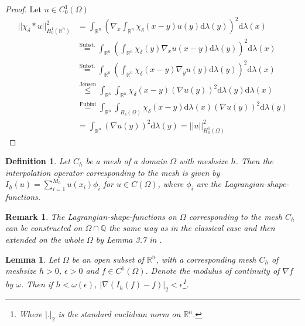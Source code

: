 \documentclass[11pt,a4paper,leqno]{report}
\newtheorem{lemma}[theorem]{Lemma}
\newtheorem{definition}[theorem]{Definition}
\newtheorem{remark}[theorem]{Remark}
\numberwithin{equation}{chapter}
\begin{document}
\begin{proof} Let $u\in C^1_0(\Omega)$
\begin{align*}||\chi_\delta*u||_{H^1_0(\mathbb{R}^n)}^2&=\int_{\mathbb{R}^n}(\nabla_x \int_{\mathbb{R}^n}\chi_\delta(x-y)u(y)\mathrm{d}\lambda(y))^2\mathrm{d}\lambda(x)\\
&\overset{\text{Subst.}}{=}\int_{\mathbb{R}^n}(\int_{\mathbb{R}^n}\chi_\delta(y)\nabla_x u(x-y)\mathrm{d}\lambda(y))^2\mathrm{d}\lambda(x)\\
&\overset{\text{Subst.}}{=}\int_{\mathbb{R}^n}(\int_{\mathbb{R}^n}\chi_\delta(x-y)\nabla_y u(y)\mathrm{d}\lambda(y))^2\mathrm{d}\lambda(x)\\
&\overset{\text{Jensen}}{\leq}\int_{\mathbb{R}^n}\int_{\mathbb{R}^n}\chi_\delta(x-y)(\nabla u(y))^2\mathrm{d}\lambda(y)\mathrm{d}\lambda(x)\\
&\overset{\text{Fubini}}{=}\int_{\mathbb{R}^n}\int_{B_\delta(\Omega)}\chi_\delta(x-y)\mathrm{d}\lambda(x)(\nabla u(y))^2\mathrm{d}\lambda(y)\\
&=\int_{\mathbb{R}^n}(\nabla u(y))^2\mathrm{d}\lambda(y)=||u||_{H^1_0(\Omega)}^2\end{align*}
\end{proof}
\begin{definition} Let $C_h$ be a mesh of a domain $\Omega$ with meshsize $h$. Then the interpolation operator corresponding to the mesh is given by $I_h(u)=\sum_{i=1}^{M_h}u(x_i)\phi_i$ for $u\in C(\Omega)$, where $\phi_i$ are the Lagrangian-shape-functions.\end{definition}
\begin{remark} The Lagrangian-shape-functions on $\Omega$ corresponding to the mesh $C_h$ can be constructed on $\Omega\cap\mathbb{Q}$ the same way as in the classical case and then extended on the whole $\Omega$ by Lemma 3.7 in \cite[p. 91]{CANA}.
\end{remark}
\begin{lemma} Let $\Omega$ be an open subset of $\mathbb{R}^n$, with a corresponding mesh $C_h$ of meshsize $h>0$, $\epsilon>0$ and $f\in C^1(\Omega)$. Denote the modulus of continuity of $\nabla f$ by $\omega$. Then if $h<\omega(\epsilon)$, $|\nabla(I_h(f)-f)|_2<\epsilon$\footnote{Where $|.|_2$ is the standard euclidean norm on $\mathbb{R}^n$.}.\end{lemma}
\end{document}
